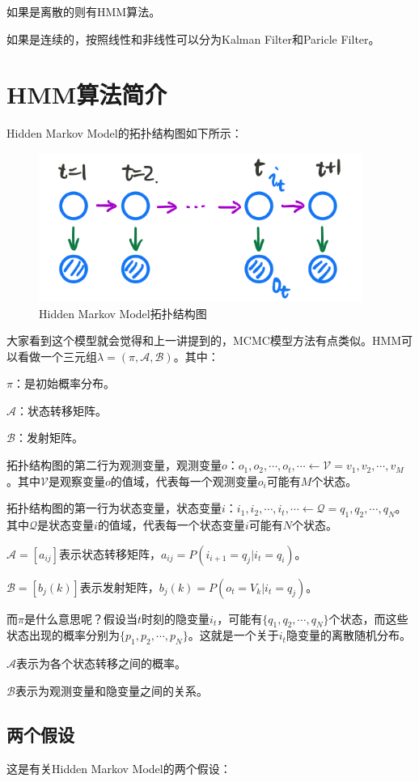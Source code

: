 \documentclass[a4paper]{article}
\begin{document}
如果是离散的则有HMM算法。

如果是连续的，按照线性和非线性可以分为Kalman Filter和Paricle Filter。

\section{HMM算法简介}
Hidden Markov Model的拓扑结构图如下所示：
\begin{figure}[H]
    \centering
    \includegraphics[width=.45\textwidth]{微信图片_20200107213811.png}
    \caption{Hidden Markov Model拓扑结构图}
    \label{fig:my_label_1}
\end{figure}

大家看到这个模型就会觉得和上一讲提到的，MCMC模型方法有点类似。HMM可以看做一个三元组$\lambda = (\pi, \mathcal{A}, \mathcal{B})$。其中：

$\pi$：是初始概率分布。

$\mathcal{A}$：状态转移矩阵。

$\mathcal{B}$：发射矩阵。

拓扑结构图的第二行为观测变量，观测变量$o$：$o_1,o_2,\cdots,o_t,\cdots \leftarrow \mathcal{V} = {v_1,v_2,\cdots,v_M}$。其中$\mathcal{V}$是观察变量$o$的值域，代表每一个观测变量$o_i$可能有$M$个状态。

拓扑结构图的第一行为状态变量，状态变量$i$：$i_1,i_2,\cdots,i_t,\cdots \leftarrow \mathcal{Q} = {q_1,q_2,\cdots,q_N}$。其中$\mathcal{Q}$是状态变量$i$的值域，代表每一个状态变量$i$可能有$N$个状态。

$\mathcal{A} = [a_{ij}]$表示状态转移矩阵，$a_{ij} = P(i_{i+1}=q_j|i_t=q_i)$。

$\mathcal{B} = [b_j(k)]$表示发射矩阵，$b_j(k) = P(o_t = V_k | i_t = q_j)$。

而$\pi$是什么意思呢？假设当$t$时刻的隐变量$i_t$，可能有$\{ q_1,q_2,\cdots,q_N \}$个状态，而这些状态出现的概率分别为$\{ p_1,p_2,\cdots,p_N \}$。这就是一个关于$i_t$隐变量的离散随机分布。

$\mathcal{A}$表示为各个状态转移之间的概率。

$\mathcal{B}$表示为观测变量和隐变量之间的关系。

\subsection{两个假设}
这是有关Hidden Markov Model的两个假设：
\end{document}
